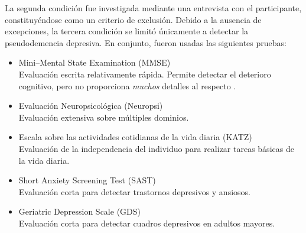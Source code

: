%
La segunda condición fue investigada mediante una entrevista con el participante, constituyéndose como un criterio de exclusión.
%
Debido a la ausencia de excepciones, la tercera condición se limitó únicamente a detectar la pseudodemencia depresiva.
%
En conjunto, fueron usadas las siguientes pruebas:
\begin{itemize}
\item {Mini--Mental State Examination (MMSE)}\\
Evaluación escrita relativamente rápida. Permite detectar el deterioro cognitivo, pero no proporciona \textit{muchos} detalles al respecto \cite{folstein75}. \cite{Velasco15}

\item {Evaluación Neuropsicológica (Neuropsi)}\\
Evaluación extensiva sobre múltiples dominios. \cite{Solis03}

\item {Escala sobre las actividades cotidianas de la vida diaria (KATZ)}\\
Evaluación de la independencia del individuo para realizar tareas básicas de la vida diaria.\cite{katz70} \cite{Roumec14}

\item {Short Anxiety Screening Test (SAST)}\\ 
Evaluación corta para detectar trastornos depresivos y ansiosos. \cite{sinoff99}

\item {Geriatric Depression Scale (GDS)}\\
Evaluación corta para detectar cuadros depresivos en adultos mayores. \cite{Yesavage82}
\end{itemize}

